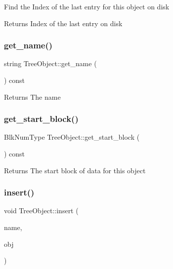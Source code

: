 Find the Index of the last entry for this object on disk \begin{DoxyReturn}{Returns}
Index of the last entry on disk 
\end{DoxyReturn}
\mbox{\label{classTreeObject_a5216922ec0b98bcc375601db8d253770}} 
\subsubsection{\texorpdfstring{get\+\_\+name()}{get\_name()}}
{\footnotesize\ttfamily string Tree\+Object\+::get\+\_\+name (\begin{DoxyParamCaption}{ }\end{DoxyParamCaption}) const}

\begin{DoxyReturn}{Returns}
The name 
\end{DoxyReturn}
\mbox{\label{classTreeObject_a16153734dbee4adc99fa195715728c2f}} 
\subsubsection{\texorpdfstring{get\+\_\+start\+\_\+block()}{get\_start\_block()}}
{\footnotesize\ttfamily Blk\+Num\+Type Tree\+Object\+::get\+\_\+start\+\_\+block (\begin{DoxyParamCaption}{ }\end{DoxyParamCaption}) const}

\begin{DoxyReturn}{Returns}
The start block of data for this object 
\end{DoxyReturn}
\mbox{\label{classTreeObject_af8cc57edba9f435b52ccf33cfbbb2fc6}} 
\subsubsection{\texorpdfstring{insert()}{insert()}}
{\footnotesize\ttfamily void Tree\+Object\+::insert (\begin{DoxyParamCaption}\item[{string}]{name,  }\item[{\mbox{\hyperlink{classTreeObject}{Tree\+Object}} $\ast$}]{obj }\end{DoxyParamCaption})\hspace{0.3cm}{\ttfamily [virtual]}}

